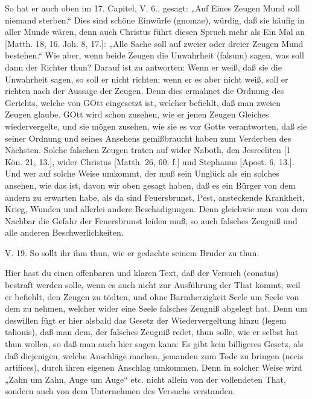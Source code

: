 So hat er auch oben im 17. Capitel, V. 6., gesagt: „Auf Eines Zeugen Mund soll niemand sterben.“ Dies sind schöne Einwürfe (gnomae), würdig, daß sie häufig in aller Munde wären, denn auch Christus führt diesen Spruch mehr als Ein Mal an [Matth. 18, 16. Joh. 8, 17.]: „Alle Sache soll auf zweier oder dreier Zeugen Mund bestehen.“ Wie aber, wenn beide Zeugen die Unwahrheit (falsum) sagen, was
soll dann der Richter thun? Darauf ist zu antworten: Wenn er weiß, daß sie die Unwahrheit sagen, so soll er nicht richten; wenn er es aber nicht weiß, soll er richten nach der Aussage der Zeugen. Denn dies ermahnet die Ordnung des Gerichts, welche von GOtt eingesetzt ist, welcher befiehlt, daß man zweien Zeugen glaube. GOtt wird schon zusehen, wie er jenen Zeugen Gleiches wiedervergelte, und sie mögen zusehen, wie sie es vor Gotte verantworten, daß sie seiner Ordnung und seines Ansehens gemißbraucht haben zum Verderben des Nächsten. Solche falschen Zeugen traten auf wider Naboth, den Jesreeliten [1 Kön. 21, 13.], wider Christus [Matth. 26, 60. f.] und Stephanus [Apost. 6, 13.]. Und wer auf solche Weise umkommt, der muß sein Unglück als ein solches ansehen, wie das ist, davon wir oben gesagt haben, daß es ein Bürger von dem andern zu erwarten habe, als da sind Feuersbrunst, Pest, ansteckende Krankheit, Krieg, Wunden und allerlei andere Beschädigungen. Denn gleichwie man von dem Nachbar die Gefahr der Feuersbrunst leiden muß, so auch falsches Zeugniß und alle anderen Beschwerlichkeiten.

\begin{schriftzitat}
V. 19. So sollt ihr ihm thun, wie er gedachte seinem Bruder zu thun.
\end{schriftzitat}

Hier hast du einen offenbaren und klaren Text, daß der Versuch (conatus) bestraft werden solle, wenn es auch nicht zur Ausführung der That kommt, weil er befiehlt, den Zeugen zu tödten, und ohne Barmherzigkeit Seele um Seele von dem zu nehmen, welcher wider eine Seele falsches Zeugniß abgelegt hat. Denn um deswillen fügt er hier alsbald das Gesetz der Wiedervergeltung hinzu (legem talionis), daß man dem, der falsches Zeugniß redet, thun solle, wie er selbst hat thun wollen, so daß man auch hier sagen kann: Es gibt kein billigeres Gesetz, als daß diejenigen, welche Anschläge machen, jemanden zum Tode zu bringen (necis artifices), durch ihren eigenen Anschlag umkommen. Denn in solcher Weise wird „Zahn um Zahn, Auge um Auge“ etc. nicht allein von der vollendeten That, sondern auch von dem Unternehmen des Versuchs verstanden.

